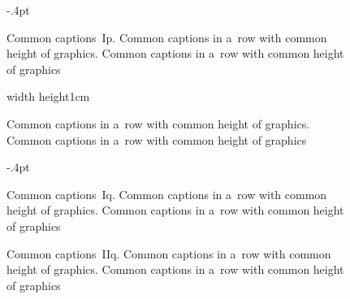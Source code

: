 \documentclass{book}
\begin{document}
\begin{figure}[H]\fboxsep-.4pt
{\begin{floatrow}[2]%
\ffigbox[\FBwidth]{}%
{\begin{subfloatrow}[3]%
%
\ffigbox[\FBwidth]{}{\caption{}%
\label{fig:CHs:WcatIbz}%
{\vrule width30pt height2cm}}%
\ffigbox[\FBwidth]{}{\caption{}%
\label{fig:CHs:WcatIbzz}%
{\vrule width30pt height2.4cm}}
\end{subfloatrow}\caption{Common captions~Ip.
Common captions in a~row with common height of graphics.
Common captions in a~row with common height of graphics}}%
\ffigbox[\Xhsize]{}%
{\vrule width\hsize
 height1cm\caption{%
Common captions in a~row with common height of graphics.
Common captions in a~row with common height of graphics}}
\end{floatrow}}%
\end{figure}%

\begin{figure}[H]\fboxsep-.4pt
{\begin{floatrow}[2]%
\ffigbox[\FBwidth]{}%
{\begin{subfloatrow}[2]%
%
\ffigbox[\FBwidth]{}{\caption{}%
\label{fig:CHs:WcatIcz}%
{\vrule width30pt height2cm}}
\end{subfloatrow}\caption{Common captions~Iq.
Common captions in a~row with common height of graphics.
Common captions in a~row with common height of graphics}}%
\ffigbox[\Xhsize]{}%
{\begin{subfloatrow}[2]\useFCwidth%
%
\ffigbox[\Xhsize]{}{\caption{}%
\label{fig:CHs:WcatIczz}%
{\vrule width\hsize height2cm}}
\end{subfloatrow}\caption{Common captions~IIq.
Common captions in a~row with common height of graphics.
Common captions in a~row with common height of graphics}}
\end{floatrow}}%
\end{figure}%
\endgroup
\end{document}
